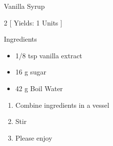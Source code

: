 \begin{Large}
    Vanilla Syrup
\end{Large}

\begin{scriptsize}
\begin{multicols}{2}
[
\vspace{1em}
Yields: 1 Units
\vspace{-1.5em}
]

Ingredients
\begin{itemize}
    \item 1/8 tsp vanilla extract %
    \item 16 g sugar
    \item 42 g Boil Water 
\end{itemize}
\end{multicols}
\end{scriptsize}

\begin{footnotesize}
\begin{enumerate}
    \item Combine ingredients in a vessel
    \item Stir
    \item Please enjoy
\end{enumerate}
\end{footnotesize}

\vspace{2em}
